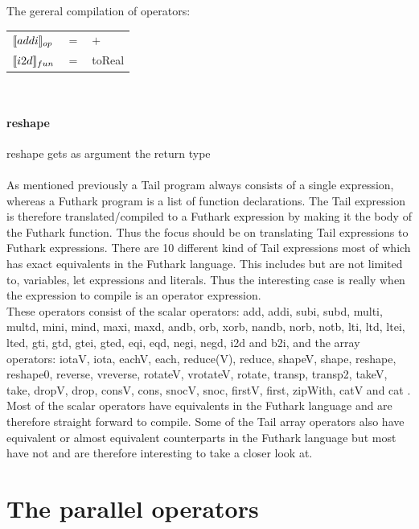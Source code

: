 \documentclass[11pt]{article}
\begin{document}
The gereral compilation of operators:\\

\begin{tabular}{l c l}
$\llbracket addi \rrbracket_{op}$ & $=$ & $+$\\
$\llbracket i2d \rrbracket_{fun}$ & $=$ & toReal\\ 
\end{tabular}\\

\paragraph{reshape}
reshape gets as argument the return type\\\\

As mentioned previously a Tail program always consists of a single expression,
whereas a Futhark program is a list of function declarations.
The Tail expression is therefore translated/compiled to a Futhark expression by making it the body of the Futhark function\cite{ElsmanDybdal:Array:2014}\cite{TroelsHenriksen}. 
Thus the focus should be on translating Tail expressions to Futhark expressions. 
There are 10 different kind of Tail expressions most of which has exact equivalents in the Futhark language.
This includes but are not limited to, variables, let expressions and literals.
Thus the interesting case is really when the expression to compile is an operator expression. \\

These operators consist of the scalar operators: add, addi, subi, subd, multi, multd, mini, mind, maxi, maxd, andb, orb, xorb, nandb, norb, notb, lti, ltd, ltei, lted, gti, gtd, gtei, gted, eqi, eqd, negi, negd, i2d and b2i, and the array operators: iotaV, iota, eachV, each, reduce(V), reduce, shapeV, shape, reshape, reshape0, reverse, vreverse, rotateV, vrotateV, rotate, transp, transp2, takeV, take, dropV, drop, consV, cons, snocV, snoc, firstV, first, zipWith, catV and cat \cite{ElsmanDybdal:Array:2014}. \\

Most of the scalar operators have equivalents in the Futhark language and are therefore straight forward to compile.
Some of the Tail array operators also have equivalent or almost equivalent counterparts in the Futhark language
but most have not and are therefore interesting to take a closer look at.


\section{The parallel operators}
\end{document}
